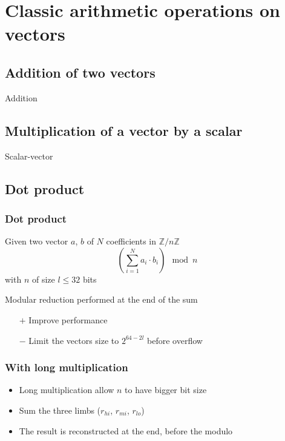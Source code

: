 \documentclass[10pt]{beamer}
\begin{document}
\section{Classic arithmetic operations on vectors}
\subsection{Addition of two vectors}
\begin{frame}
    Addition
\end{frame}

\subsection{Multiplication of a vector by a scalar}
\begin{frame}
    Scalar-vector
\end{frame}

\subsection{Dot product}
\begin{frame}
    \frametitle{Dot product}
    \begin{example}
        Given two vector $a$, $b$ of $N$ coefficients in $\mathbb{Z}/n\mathbb{Z}$
        \[
            \left(\sum^N_{i=1}a_i\cdot b_i\right) \mod n
        \]
        with $n$ of size $l \leq 32$ bits
    \end{example}

    \pause
    Modular reduction performed at the end of the sum
    \begin{itemize}
        \item[$+$] Improve performance
        \item[$-$] Limit the vectors size to $2^{64 - 2l}$ before overflow
    \end{itemize}
\end{frame}

\begin{frame}
    \frametitle{With long multiplication} %
    \begin{itemize}
        \item Long multiplication allow $n$ to have bigger bit size
        \item Sum the three limbs ($r_{hi}$, $r_{mi}$, $r_{lo}$)
        \item The result is reconstructed at the end, before the modulo
    \end{itemize}
\end{frame}
\end{document}
